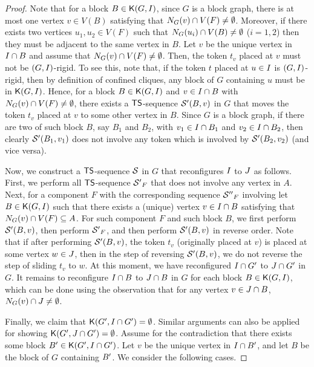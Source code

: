 \documentclass[a4paper]{llncs}
\begin{document}
\begin{proof}
\noindent
Note that for a block $B \in {\mathsf K}{(G, I)}$, 
	since $G$ is a block graph, 
	there is at most one vertex $v \in V(B)$ satisfying that $N_{G}(v) \cap V(F) \neq \emptyset$.
Moreover, if there exists two vertices $u_1, u_2 \in V(F)$ such that $N_{G}(u_i) \cap V(B) \neq \emptyset$ ($i = 1, 2$) then they must be adjacent to the same vertex in $B$.
Let $v$ be the unique vertex in $I \cap B$ and assume that $N_{G}(v) \cap V(F) \neq \emptyset$.
Then, the token $t_v$ placed at $v$ must not be $(G, I)$-rigid.
To see this, note that, if the token $t$ placed at $u \in I$ is $(G, I)$-rigid, then by definition of confined cliques, any block of $G$ containing $u$ must be in ${\mathsf K}{(G, I)}$. 
Hence, for a block $B \in {\mathsf K}{(G, I)}$ and $v \in I \cap B$ with $N_{G}(v) \cap V(F) \neq \emptyset$, there exists a ${\sf TS}$-sequence ${{\cal S}^\prime}(B, v)$ in $G$ that moves the token $t_v$ placed at $v$ to some other vertex in $B$.
Since $G$ is a block graph, if there are two of such block $B$, say $B_1$ and $B_2$, with $v_1 \in I \cap B_1$ and $v_2 \in I \cap B_2$,
	then clearly ${{\cal S}^\prime}(B_1, v_1)$ does not involve any token which is involved by ${{\cal S}^\prime}(B_2, v_2)$ (and vice versa). 

Now, we construct a ${\sf TS}$-sequence ${\cal S}$ in $G$ that reconfigures $I$ to $J$ as follows.
First, we perform all ${\sf TS}$-sequence ${{\cal S}^\prime}_F$ that does not involve any vertex in $A$.
Next, for a component $F$ with the corresponding sequence ${{\cal S}^{\prime\prime}}_F$ involving  
	let $B \in {\mathsf K}{(G, I)}$ such that there exists a (unique) vertex $v \in I \cap B$ satisfying that $N_{G}(v) \cap V(F) \subseteq A$.
For such component $F$ and such block $B$, we first perform ${{\cal S}^\prime}(B, v)$, then perform ${{\cal S}^\prime}_F$, and then perform ${{\cal S}^\prime}(B, v)$ in reverse order.
Note that if after performing ${{\cal S}^\prime}(B, v)$, the token $t_v$ (originally placed at $v$) is placed at some vertex $w \in J$, then in the step of reversing ${{\cal S}^\prime}(B, v)$, we do not reverse the step of sliding $t_v$ to $w$.
At this moment, we have reconfigured $I \cap {G^\prime}$ to $J \cap {G^\prime}$ in $G$. 
It remains to reconfigure $I \cap B$ to $J \cap B$ in $G$ for each block $B \in {\mathsf K}{(G, I)}$, which can be done using the observation that for any vertex $v \in J \cap B$, $N_{G}(v) \cap J \neq \emptyset$.

Finally, we claim that ${\mathsf K}{({G^\prime}, I \cap {G^\prime})} = \emptyset$.
Similar arguments can also be applied for showing ${\mathsf K}{({G^\prime}, J \cap {G^\prime})} = \emptyset$.
Assume for the contradiction that there exists some block $B^\prime \in {\mathsf K}{({G^\prime}, I\cap {G^\prime})}$.
Let $v$ be the unique vertex in $I \cap B^\prime$, and let $B$ be the block of $G$ containing $B^{\prime}$.
We consider the following cases.


\end{proof}
\end{document}
